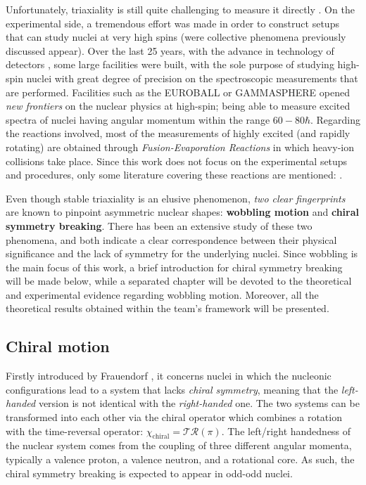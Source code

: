 Unfortunately, triaxiality is still quite challenging to measure it directly \cite{hamamoto2016interplay,budaca2018tilted}. On the experimental side, a tremendous effort was made in order to construct setups that can study nuclei at very high spins (were collective phenomena previously discussed appear). Over the last 25 years, with the advance in technology of detectors \cite{henning2012stability}, some large facilities were built, with the sole purpose of studying high-spin nuclei with great degree of precision on the spectroscopic measurements that are performed. Facilities such as the EUROBALL \cite{simpson1997euroball} or GAMMASPHERE \cite{lee1990gammasphere} opened \emph{new frontiers} on the nuclear physics at high-spin; being able to measure excited spectra of nuclei having angular momentum within the range $60-80\hbar$. Regarding the reactions involved, most of the measurements of highly excited (and rapidly rotating) are obtained through \emph{Fusion-Evaporation Reactions} in which heavy-ion collisions take place. Since this work does not focus on the experimental setups and procedures, only some literature covering these reactions are mentioned: \cite{gu2007theoretical,henning2012stability,ayangeakaa2013exotic,matta2017exotic,das2018nuclear,lewis2019lifetime,sensharma2021wobbling}.

Even though stable triaxiality is an elusive phenomenon, \emph{two clear fingerprints} are known to pinpoint asymmetric nuclear shapes: \textbf{wobbling motion} and \textbf{chiral symmetry breaking}. There has been an extensive study of these two phenomena, and both indicate a clear correspondence between their physical significance and the lack of symmetry for the underlying nuclei. Since wobbling is the main focus of this work, a brief introduction for chiral symmetry breaking will be made below, while a separated chapter will be devoted to the theoretical and experimental evidence regarding wobbling motion. Moreover, all the theoretical results obtained within the team's framework will be presented.

\subsection{Chiral motion}
\label{chiral-section}

Firstly introduced by Frauendorf \cite{frauendorf1997tilted}, it concerns nuclei in which the nucleonic configurations lead to a system that lacks \emph{chiral symmetry}, meaning that the \emph{left-handed} version is not identical with the \emph{right-handed} one. The two systems can be transformed into each other via the chiral operator which combines a rotation with the time-reversal operator: $\chi_\text{chiral}=\mathcal{T}\mathcal{R}(\pi)$. The left/right handedness of the nuclear system comes from the coupling of three different angular momenta, typically a valence proton, a valence neutron, and a rotational core. As such, the chiral symmetry breaking is expected to appear in odd-odd nuclei.

